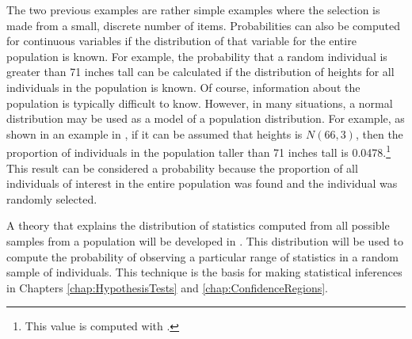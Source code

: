 \documentclass[10pt,openany]{book}\usepackage[]{graphicx}\usepackage[]{color}
\begin{document}

The two previous examples are rather simple examples where the selection is made from a small, discrete number of items.  Probabilities can also be computed for continuous variables if the distribution of that variable for the entire population is known.  For example, the probability that a random individual is greater than 71 inches tall can be calculated if the distribution of heights for all individuals in the population is known.  Of course, information about the population is typically difficult to know.  However, in many situations, a normal distribution may be used as a model of a population distribution.  For example, as shown in an example in , if it can be assumed that heights is $N(66,3)$, then the proportion of individuals in the population taller than 71 inches tall is 0.0478.\footnote{This value is computed with .}  This result can be considered a probability because the proportion of all individuals of interest in the entire population was found and the individual was randomly selected.


A theory that explains the distribution of statistics computed from all possible samples from a population will be developed in .  This distribution will be used to compute the probability of observing a particular range of statistics in a random sample of individuals.  This technique is the basis for making statistical inferences in Chapters \ref{chap:HypothesisTests} and \ref{chap:ConfidenceRegions}.
\end{document}
